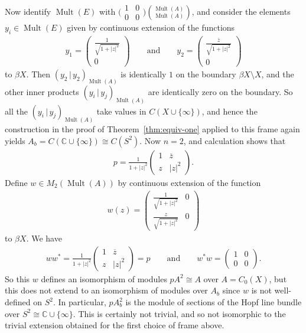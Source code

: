 \documentclass[pdftex]{sigma}
\numberwithin{equation}{section}
\DeclareMathOperator{\Mult}{Mult} %
\newcommand{\C}{\mathbb{C}} %
\newcommand{\ol}[1]{\overline{#1}} %
\begin{document}
\begin{Example}
Now identify $\Mult(E)$ with $\big(\begin{smallmatrix} 1 & 0 \\0 & 0 \end{smallmatrix}\big) \binom{\Mult(A)}{\Mult(A)}$, and consider the elements
$y_i \in \Mult(E)$ given by continuous extension of the functions
\begin{gather*}
y_1=\begin{pmatrix} \frac{1}{\sqrt{1+|z|^2}} \\ 0\end{pmatrix}\qquad\mbox{and}\qquad
y_2=\begin{pmatrix} \frac{\ol{z}}{\sqrt{1+|z|^2}} \\ 0\end{pmatrix}
\end{gather*}
to $\beta X$. Then $(y_2 \,|\, y_2)_{\Mult(A)}$ is identically $1$ on the boundary $\beta X \setminus X$, and the other inner products $(y_i \,|\, y_j)_{\Mult(A)}$ are identically zero on the boundary. So all the $(y_i \,|\, y_j)_{\Mult(A)}$ take values in $C(X \cup \{\infty\})$, and hence the construction in the proof of Theorem~\ref{thm:equiv-one} applied to this frame again yields $A_b = C(\C \cup\{\infty\}) \cong C(S^2)$. Now $n =
2$, and calculation shows that
\begin{gather*}
p = \frac{1}{1+|z|^2}\begin{pmatrix} 1 & \ol{z}\\ z & |z|^2\end{pmatrix}.
\end{gather*}
Def\/ine $w\in M_2(\Mult(A))$ by continuous extension of the function
\begin{gather*}
w(z) = \begin{pmatrix} \frac{1}{\sqrt{1+|z|^2}} & 0\\ \frac{z}{\sqrt{1+|z|^2}} & 0\end{pmatrix}
\end{gather*}
to $\beta X$. We have
\begin{gather*}
ww^*=\frac{1}{1+|z|^2}\begin{pmatrix} 1 & \ol{z}\\ z & |z|^2\end{pmatrix} = p\qquad\mbox{and}\qquad
w^*w=\begin{pmatrix} 1 & 0\\ 0 & 0\end{pmatrix}.
\end{gather*}
So this $w$ def\/ines an isomorphism of modules $pA^2 \cong A$ over $A = C_0(X)$, but this does not extend to an isomorphism of modules over $A_b$ since $w$ is not well-def\/ined on $S^2$. In particular, $p A_b^2$ is the module of sections of the Hopf line bundle over $S^2 \cong \C \cup \{\infty\}$. This is certainly not trivial, and so not isomorphic to the trivial extension obtained for the f\/irst choice of frame above.
\end{Example}
\end{document}
